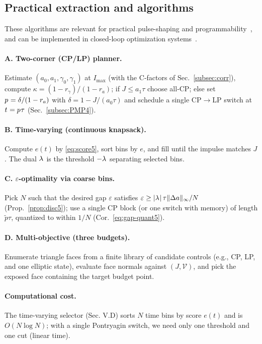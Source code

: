 \documentclass[aps,pre,twocolumn,showpacs,superscriptaddress]{revtex4-2}
\theoremstyle{definition}
\begin{document}
\subsection{Practical extraction and algorithms}\label{subsec:alg5}

These algorithms are relevant for practical pulse-shaping and programmability~\cite{Afeyan2013EPJ_STUD,Ma2021MRE_Broadband}, and can be implemented in closed-loop optimization systems~\cite{Loughran2023HPLSE_Bayes}.

\paragraph*{A. Two-corner (CP/LP) planner.}
Estimate $(a_0,a_1,\gamma_0,\gamma_1)$ at $I_{\max}$ (with the C‑factors of Sec.~\ref{subsec:corr}), compute
$\kappa=(1-r_\gamma)/(1-r_a)$; if $J\le a_1\tau$ choose all‑CP; else set $p^{\*}=\delta/(1-r_a)$ with $\delta=1-J/(a_0\tau)$ and schedule a single CP$\to$LP switch at $t^{\*}=p^{\*}\tau$ (Sec.~\ref{subsec:PMP4}).

\paragraph*{B. Time-varying (continuous knapsack).}
Compute $e(t)$ by \eqref{eq:score5}, sort bins by $e$, and fill until the impulse matches $J$. The dual $\lambda^{\*}$ is the threshold $-\lambda^{\*}$ separating selected bins.

\paragraph*{C. $\varepsilon$-optimality via coarse bins.}
Pick $N$ such that the desired gap $\varepsilon$ satisfies $\varepsilon\ge |\lambda^{\*}|\,\tau\|\Delta a\|_\infty/N$ (Prop.~\ref{prop:disc5}); use a single CP block (or one switch with memory) of length $\tilde p\tau$, quantized to within $1/N$ (Cor.~\ref{eq:gap-quant5}).

\paragraph*{D. Multi-objective (three budgets).}
Enumerate triangle faces from a finite library of candidate controls (e.g., CP, LP, and one elliptic state), evaluate face normals against $(J,\mathcal{V})$, and pick the exposed face containing the target budget point.

\paragraph*{Computational cost.}
The time-varying selector (Sec. V.D) sorts $N$ time bins by score $e(t)$ and is $O(N\log N)$; with a single Pontryagin switch, we need only one threshold and one cut (linear time).
\end{document}
